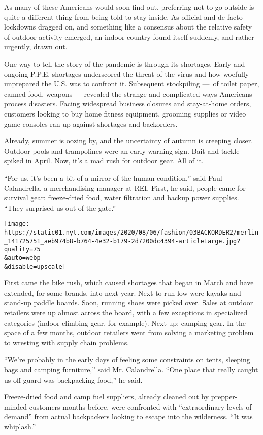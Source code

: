 As many of these Americans would soon find out, preferring not to go
outside is quite a different thing from being told to stay inside. As
official and de facto lockdowns dragged on, and something like a
consensus about the relative safety of outdoor activity emerged, an
indoor country found itself suddenly, and rather urgently, drawn out.

One way to tell the story of the pandemic is through its shortages.
Early and ongoing P.P.E. shortages underscored the threat of the virus
and how woefully unprepared the U.S. was to confront it. Subsequent
stockpiling ---~of toilet paper, canned food, weapons --- revealed the
strange and complicated ways Americans process disasters. Facing
widespread business closures and stay-at-home orders, customers looking
to buy home fitness equipment, grooming supplies or video game consoles
ran up against shortages and backorders.

Already, summer is oozing by, and the uncertainty of autumn is creeping
closer. Outdoor pools and trampolines were an early warning sign. Bait
and tackle spiked in April. Now, it's a mad rush for outdoor gear. All
of it.

``For us, it's been a bit of a mirror of the human condition,'' said
Paul Calandrella, a merchandising manager at REI. First, he said, people
came for survival gear: freeze-dried food, water filtration and backup
power supplies. ``They surprised us out of the gate.''

\texttt{[image: https://static01.nyt.com/images/2020/08/06/fashion/03BACKORDER2/merlin\_141725751\_aeb974b8-b764-4e32-b179-2d7200dc4394-articleLarge.jpg?quality=75\\\&auto=webp\\\&disable=upscale]}

First came the bike rush, which caused shortages that began in March and
have extended, for some brands, into next year. Next to run low were
kayaks and stand-up paddle boards. Soon, running shoes were picked over.
Sales at outdoor retailers were up almost across the board, with a few
exceptions in specialized categories (indoor climbing gear, for
example). Next up: camping gear. In the space of a few months, outdoor
retailers went from solving a marketing problem to wresting with supply
chain problems.

``We're probably in the early days of feeling some constraints on tents,
sleeping bags and camping furniture,'' said Mr. Calandrella. ``One place
that really caught us off guard was backpacking food,'' he said.

Freeze-dried food and camp fuel suppliers, already cleaned out by
prepper-minded customers months before, were confronted with
``extraordinary levels of demand'' from actual backpackers looking to
escape into the wilderness. ``It was whiplash.''

